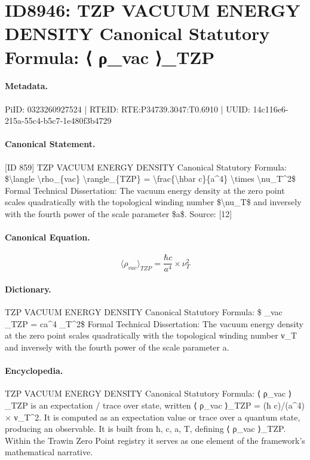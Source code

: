 \section*{ID8946: TZP VACUUM ENERGY DENSITY Canonical Statutory Formula: ⟨ ρ\_vac ⟩\_TZP}
\paragraph{Metadata.}
PiID: 0323260927524 | RTEID: RTE:P34739.3047:T0.6910 | UUID: 14c116e6-215a-55c4-b5c7-1e480f3b4729

\paragraph{Canonical Statement.}
[ID 859] TZP VACUUM ENERGY DENSITY Canonical Statutory Formula: \$\textbackslash{}langle \textbackslash{}rho\_\{vac\} \textbackslash{}rangle\_\{TZP\} = \textbackslash{}frac\{\textbackslash{}hbar c\}\{a\textasciicircum{}4\} \textbackslash{}times \textbackslash{}nu\_T\textasciicircum{}2\$ Formal Technical Dissertation: The vacuum energy density at the zero point scales quadratically with the topological winding number \$\textbackslash{}nu\_T\$ and inversely with the fourth power of the scale parameter \$a\$. Source: [12]

\paragraph{Canonical Equation.}
\[
\langle \rho_{vac} \rangle_{TZP} = \frac{\hbar c}{a^4} \times \nu_T^2
\]

\paragraph{Dictionary.}
TZP VACUUM ENERGY DENSITY Canonical Statutory Formula: \$ \_vac \_TZP = ca\textasciicircum{}4 \_T\textasciicircum{}2\$ Formal Technical Dissertation: The vacuum energy density at the zero point scales quadratically with the topological winding number ν\_T and inversely with the fourth power of the scale parameter a.

\paragraph{Encyclopedia.}
TZP VACUUM ENERGY DENSITY Canonical Statutory Formula: ⟨ ρ\_vac ⟩\_TZP is an expectation / trace over state, written ⟨ ρ\_vac ⟩\_TZP = (ħ c)/(a\textasciicircum{}4) × ν\_T\textasciicircum{}2. It is computed as an expectation value or trace over a quantum state, producing an observable. It is built from ħ, c, a, T, defining ⟨ ρ\_vac ⟩\_TZP. Within the Trawin Zero Point registry it serves as one element of the framework's mathematical narrative.
